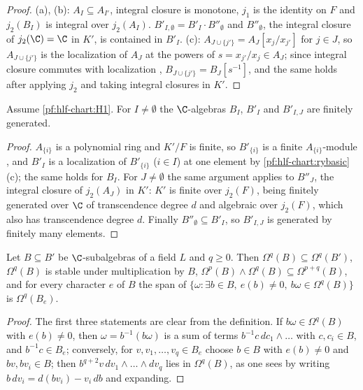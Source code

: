 \begin{proof}
(a), (b): $A_I\subseteq A_{I'}$, integral closure is monotone, $j_1$ is the identity on $F$ and $j_2(B_I)$ is integral over $j_2(A_I)$.
$B'_{I,\emptyset}=B'_I\cdot B''_\emptyset$ and $B''_\emptyset$, the integral closure of $j_2(\C)=\C$ in $K'$, is contained in $B'_I$.
(c): $A_{J\cup\{j'\}}=A_J[x_j/x_{j'}]$ for $j\in J$, so $A_{J\cup\{j'\}}$ is the localization of $A_J$ at the powers of $s=x_{j'}/x_j\in A_J$;
since integral closure commutes with localization \cite[Prop.~5.12]{AtiyahMacdonald1969}, $B_{J\cup\{j'\}}=B_J[s^{-1}]$, and the same
holds after applying $j_2$ and taking integral closures in $K'$.
\end{proof}

\begin{lemma}\label{pf:hlf-chart:ryft}
Assume \ref{pf:hlf-chart:H1}. For $I\ne\emptyset$ the $\C$-algebras $B_I$, $B'_I$ and $B'_{I,J}$ are finitely generated.
\end{lemma}

\begin{proof}
$A_{\{i\}}$ is a polynomial ring and $K'/F$ is finite, so $B'_{\{i\}}$ is a finite $A_{\{i\}}$-module \cite[Cor.~13.13]{Eisenbud1995}, and
$B'_I$ is a localization of $B'_{\{i\}}$ ($i\in I$) at one element by \cref{pf:hlf-chart:rybasic}(c); the same holds for $B_I$. For $J\ne\emptyset$
the same argument applies to $B''_J$, the integral closure of $j_2(A_J)$ in $K'$: $K'$ is finite over $j_2(F)$, being finitely generated over
$\C$ of transcendence degree $d$ and algebraic over $j_2(F)$, which also has transcendence degree $d$. Finally $B''_\emptyset\subseteq B'_I$, so
$B'_{I,J}$ is generated by finitely many elements.
\end{proof}

\begin{lemma}\label{pf:hlf-chart:omloc}
Let $B\subseteq B'$ be $\C$-subalgebras of a field $L$ and $q\ge0$. Then $\Omega^q(B)\subseteq\Omega^q(B')$, $\Omega^q(B)$ is stable under
multiplication by $B$, $\Omega^p(B)\wedge\Omega^q(B)\subseteq\Omega^{p+q}(B)$, and for every character $e$ of $B$ the span of
$\{\omega:\exists b\in B,\ e(b)\ne0,\ b\omega\in\Omega^q(B)\}$ is $\Omega^q(B_e)$.
\end{lemma}

\begin{proof}
The first three statements are clear from the definition. If $b\omega\in\Omega^q(B)$ with $e(b)\ne0$, then $\omega=b^{-1}(b\omega)$ is a sum of
terms $b^{-1}c\,dc_1\wedge\dots$ with $c,c_i\in B$, and $b^{-1}c\in B_e$; conversely, for $v,v_1,\dots,v_q\in B_e$ choose $b\in B$ with
$e(b)\ne0$ and $bv,bv_i\in B$; then $b^{q+2}v\,dv_1\wedge\dots\wedge dv_q$ lies in $\Omega^q(B)$, as one sees by writing
$b\,dv_i=d(bv_i)-v_i\,db$ and expanding.
\end{proof}

